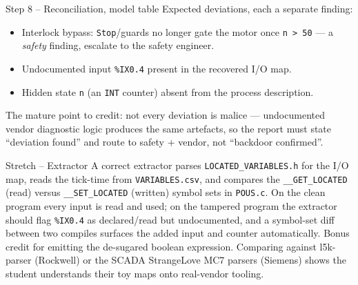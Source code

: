 \documentclass[11pt,a4paper]{article}
\begin{document}
\begin{solutionbox}{Step 8 -- Reconciliation, model table}
Expected deviations, each a separate finding:
\begin{itemize}\setlength{\itemsep}{1pt}
  \item Interlock bypass: \texttt{Stop}/guards no longer gate the motor once
        \texttt{n > 50} --- a \emph{safety} finding, escalate to the safety
        engineer.
  \item Undocumented input \texttt{\%IX0.4} present in the recovered I/O map.
  \item Hidden state \texttt{n} (an \texttt{INT} counter) absent from the
        process description.
\end{itemize}
The mature point to credit: not every deviation is malice --- undocumented
vendor diagnostic logic produces the same artefacts, so the report must
state ``deviation found'' and route to safety + vendor, not ``backdoor
confirmed''.
\end{solutionbox}

\begin{solutionbox}{Stretch -- Extractor}
A correct extractor parses \texttt{LOCATED\_VARIABLES.h} for the I/O map,
reads the tick-time from \texttt{VARIABLES.csv}, and compares the
\texttt{\_\_GET\_LOCATED} (read) versus \texttt{\_\_SET\_LOCATED} (written)
symbol sets in \texttt{POUS.c}. On the clean program every input is read and
used; on the tampered program the extractor should flag \texttt{\%IX0.4} as
declared/read but undocumented, and a symbol-set diff between two compiles
surfaces the added input and counter automatically. Bonus credit for
emitting the de-sugared boolean expression. Comparing against l5k-parser
(Rockwell) or the SCADA StrangeLove MC7 parsers (Siemens) shows the student
understands their toy maps onto real-vendor tooling.
\end{solutionbox}
\end{document}
